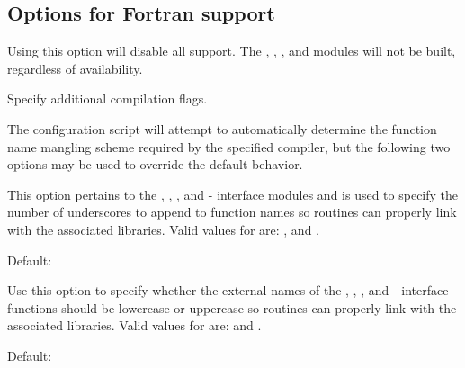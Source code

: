 
\subsection*{Options for Fortran support}

\begin{config}

\item {}

  Using this option will disable all {\F} support. The {\fcvode},
  {\fkinsol}, {\fida}, and {\fnvector} modules will not be built,
  regardless of availability.

\item {}

  Specify additional {\F} compilation flags.

\end{config}

\noindent The configuration script will attempt to automatically determine the
function name mangling scheme required by the specified {\F} compiler, but the
following two options may be used to override the default behavior.

\begin{config}

\item {}

  This option pertains to the {\fcvode}, {\fkinsol}, {\fida}, and {\fnvector}
  {\F}-{\C} interface modules and is used to specify the number of underscores to
  append to function names so {\F} routines can properly link with the associated
  {\sundials} libraries. Valid values for  are: , 
  and .

  Default: 

\item {}

  Use this option to specify whether the external names of the {\fcvode},
  {\fkinsol}, {\fida}, and {\fnvector} {\F}-{\C} interface functions should be
  lowercase or uppercase so {\F} routines can properly link with the associated
  {\sundials} libraries. Valid values for  are:  and .

  Default: 

\end{config}




